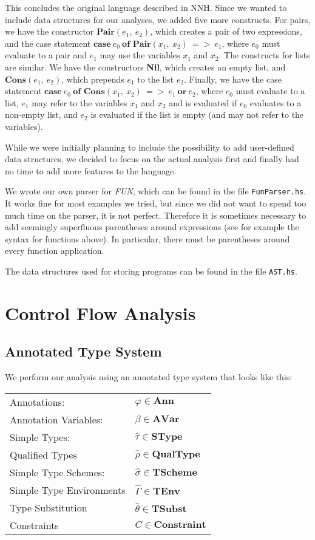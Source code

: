 \documentclass[a4paper,11pt]{article}
\begin{document}
This concludes the original language described in NNH. Since we wanted to include data structures for our analyses, we added five more constructs. For pairs, we have the constructor $\textbf{Pair}(e_1,\:e_2)$, which creates a pair of two expressions, and the case statement $\textbf{case}\:e_0\:\textbf{of Pair}(x_1,\:x_2)\:=>\:e_1$, where $e_0$ must evaluate to a pair and $e_1$ may use the variables $x_1$ and $x_2$. The constructs for lists are similar. We have the constructors \textbf{Nil}, which creates an empty list, and $\textbf{Cons}(e_1,\:e_2)$, which prepends $e_1$ to the list $e_2$. Finally, we have the case statement $\textbf{case}\:e_0\:\textbf{of Cons}(x_1,\:x_2)\:=>\:e_1\:\textbf{or}\:e_2$, where $e_0$ must evaluate to a list, $e_1$ may refer to the variables $x_1$ and $x_2$ and is evaluated if $e_0$ evaluates to a non-empty list, and $e_2$ is evaluated if the list is empty (and may not refer to the variables).

While we were initially planning to include the possibility to add user-defined data structures, we decided to focus on the actual analysis first and finally had no time to add more features to the language.

We wrote our own parser for \emph{FUN}, which can be found in the file \texttt{FunParser.hs}. It works fine for most examples we tried, but since we did not want to spend too much time on the parser, it is not perfect. Therefore it is sometimes necessary to add seemingly superfluous parentheses around expressions (see for example the syntax for functions above). In particular, there must be parentheses around every function application. 

The data structures used for storing programs can be found in the file \texttt{AST.hs}.

\section{Control Flow Analysis}


\subsection{Annotated Type System}
We perform our analysis using an annotated type system that looks like this:

\begin{tabular}{l l}
Annotations: & $\varphi \in \textbf{Ann}$ \\
Annotation Variables: &	$\beta  \in \textbf{AVar}$ \\
Simple Types: &		$\hat{\tau} \in \textbf{SType}$ \\
Qualified Types & $\hat{\rho} \in \textbf{QualType}$\\
Simple Type Schemes: &		$\hat{\sigma} \in \textbf{TScheme}$ \\
Simple Type Environments &		$\hat{\Gamma} \in \textbf{TEnv} $ \\
Type Substitution & $\hat{\theta} \in \textbf{TSubst}$\\
Constraints &	$C \in \textbf{Constraint}$ \\
\end{tabular}
\end{document}
